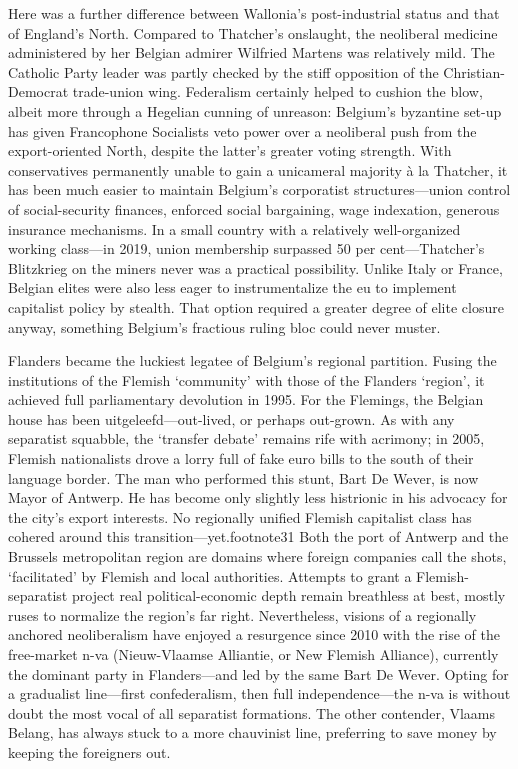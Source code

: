 \documentclass[
]{book}
\begin{document}
Here was a further difference between Wallonia's post-industrial status and that of England's North. Compared to Thatcher's onslaught, the neoliberal medicine administered by her Belgian admirer Wilfried Martens was relatively mild. The Catholic Party leader was partly checked by the stiff opposition of the Christian-Democrat trade-union wing. Federalism certainly helped to cushion the blow, albeit more through a Hegelian cunning of unreason: Belgium's byzantine set-up has given Francophone Socialists veto power over a neoliberal push from the export-oriented North, despite the latter's greater voting strength. With conservatives permanently unable to gain a unicameral majority à la Thatcher, it has been much easier to maintain Belgium's corporatist structures---union control of social-security finances, enforced social bargaining, wage indexation, generous insurance mechanisms. In a small country with a relatively well-organized working class---in 2019, union membership surpassed 50 per cent---Thatcher's Blitzkrieg on the miners never was a practical possibility. Unlike Italy or France, Belgian elites were also less eager to instrumentalize the eu to implement capitalist policy by stealth. That option required a greater degree of elite closure anyway, something Belgium's fractious ruling bloc could never muster.

Flanders became the luckiest legatee of Belgium's regional partition. Fusing the institutions of the Flemish `community' with those of the Flanders `region', it achieved full parliamentary devolution in 1995. For the Flemings, the Belgian house has been uitgeleefd---out-lived, or perhaps out-grown. As with any separatist squabble, the `transfer debate' remains rife with acrimony; in 2005, Flemish nationalists drove a lorry full of fake euro bills to the south of their language border. The man who performed this stunt, Bart De Wever, is now Mayor of Antwerp. He has become only slightly less histrionic in his advocacy for the city's export interests. No regionally unified Flemish capitalist class has cohered around this transition---yet.footnote31 Both the port of Antwerp and the Brussels metropolitan region are domains where foreign companies call the shots, `facilitated' by Flemish and local authorities. Attempts to grant a Flemish-separatist project real political-economic depth remain breathless at best, mostly ruses to normalize the region's far right. Nevertheless, visions of a regionally anchored neoliberalism have enjoyed a resurgence since 2010 with the rise of the free-market n-va (Nieuw-Vlaamse Alliantie, or New Flemish Alliance), currently the dominant party in Flanders---and led by the same Bart De Wever. Opting for a gradualist line---first confederalism, then full independence---the n-va is without doubt the most vocal of all separatist formations. The other contender, Vlaams Belang, has always stuck to a more chauvinist line, preferring to save money by keeping the foreigners out.
\end{document}
